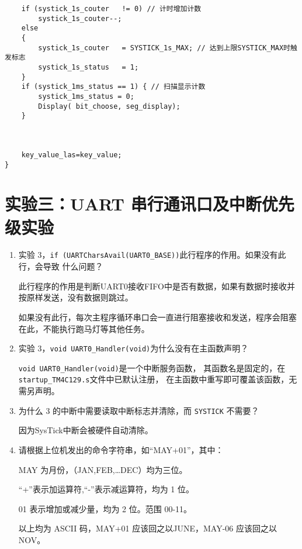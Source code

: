 \documentclass[12pt, a4paper, oneside]{ctexart}
\begin{document}
\begin{enumerate}[listparindent=2em]
\begin{lstlisting}
    if (systick_1s_couter	!= 0) // 计时增加计数
	    systick_1s_couter--;
    else
    {
	    systick_1s_couter	= SYSTICK_1s_MAX; // 达到上限SYSTICK_MAX时触发标志
	    systick_1s_status 	= 1;
    }
    if (systick_1ms_status == 1) { // 扫描显示计数
        systick_1ms_status = 0;
        Display( bit_choose, seg_display); 
    }

   

    key_value_las=key_value;
}
\end{lstlisting}
    \end{enumerate}
    
    \section{实验三：UART 串行通讯口及中断优先级实验}

    \begin{enumerate}[listparindent=2em]
        \item 实验 3，\verb|if (UARTCharsAvail(UART0_BASE))|此行程序的作用。如果没有此行，会导致
        什么问题？

        {\kaishu 此行程序的作用是判断UART0接收FIFO中是否有数据，如果有数据时接收并按原样发送，没有数据则跳过。
        
        如果没有此行，每次主程序循环串口会一直进行阻塞接收和发送，程序会阻塞在此，不能执行跑马灯等其他任务。}

        \item 实验 3，\verb|void UART0_Handler(void)|为什么没有在主函数声明？
        
        {\kaishu \verb|void UART0_Handler(void)|是一个中断服务函数，
        其函数名是固定的，在\verb|startup_TM4C129.s|文件中已默认注册，
        在主函数中重写即可覆盖该函数，无需另声明。}
        
        \item 为什么 3 的中断中需要读取中断标志并清除，而 \verb|SYSTICK| 不需要？
        
        {\kaishu 因为SysTick中断会被硬件自动清除。}

        \item 请根据上位机发出的命令字符串，如“MAY+01”，其中：
        
        MAY 为月份，（JAN,FEB,…DEC）均为三位。

        “+”表示加运算符,“-”表示减运算符，均为 1 位。

        01 表示增加或减少量，均为 2 位。范围 00-11。

        以上均为 ASCII 码，MAY+01 应该回之以JUNE，MAY-06 应该回之以 NOV。


\end{enumerate}
\end{document}
